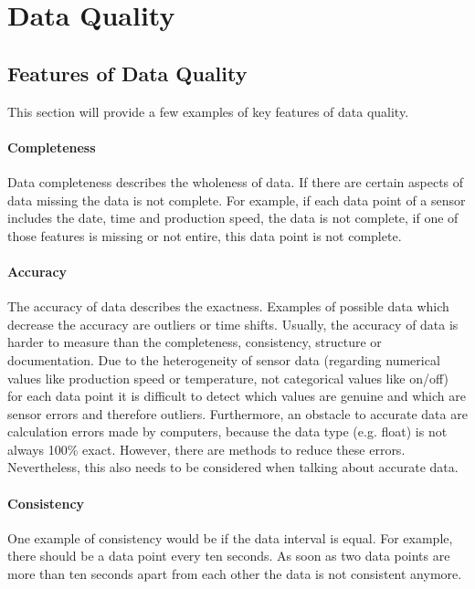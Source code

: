 \chapter{Data Quality}\label{chapter:data-quality}

\section{Features of Data Quality}\label{section:data-quality-features}
This section will provide a few examples of key features of data quality. 
\subsubsection{Completeness}
Data completeness describes the wholeness of data. If there are certain aspects of data missing the data is not complete. For example, if each data point of a sensor includes the date, time and production speed, the data is not complete, if one of those features is missing or not entire, this data point is not complete. \cite{caiChallengesDataQuality2015, songIoTDataQuality2020}
\subsubsection{Accuracy}
The accuracy of data describes the exactness. Examples of possible data which decrease the accuracy are outliers or time shifts. Usually, the accuracy of data is harder to measure than the completeness, consistency, structure or documentation. Due to the heterogeneity of sensor data (regarding numerical values like production speed or temperature, not categorical values like on/off) for each data point it is difficult to detect which values are genuine and which are sensor errors and therefore outliers. \cite{caiChallengesDataQuality2015} Furthermore, an obstacle to accurate data are calculation errors made by computers, because the data type (e.g. float) is not always 100\% exact. However, there are methods to reduce these errors. Nevertheless, this also needs to be considered when talking about accurate data.\cite{goldbergWhatEveryComputer1991, WhatEveryComputer} 

\subsubsection{Consistency}
One example of consistency would be if the data interval is equal. For example, there should be a data point every ten seconds. As soon as two data points are more than ten seconds apart from each other the data is not consistent anymore. \cite{caiChallengesDataQuality2015}
